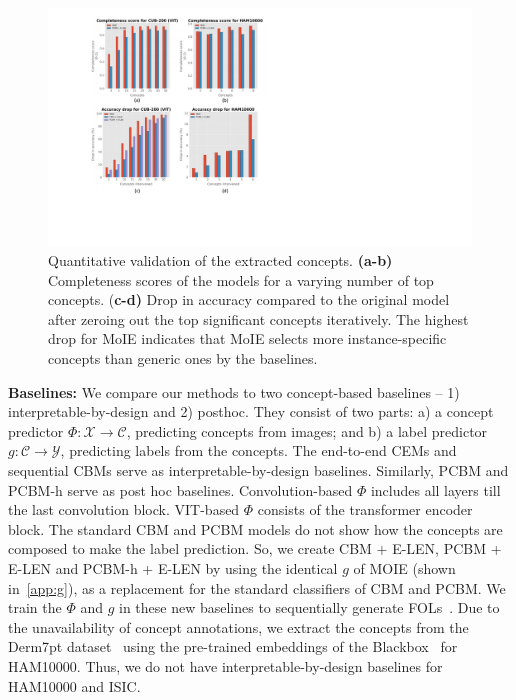 \begin{figure}[h]
\begin{center}
\centerline{\includegraphics[width=\columnwidth]{figures/main/CUB_HAM.pdf}}
\caption{Quantitative validation of the extracted concepts. \textbf{(a-b)} 
Completeness scores of the models for a varying number of top concepts. (\textbf{c-d)} Drop in accuracy compared to the original model after zeroing out the top significant concepts iteratively. The highest drop for MoIE indicates that MoIE selects more instance-specific concepts than generic ones by the baselines. 
}
\label{fig:valid_concepts}
\end{center}
\vskip -0.2in
\end{figure}


\textbf{Baselines:}
We compare our methods to two concept-based baselines -- 1) interpretable-by-design and 2) posthoc. They consist of two parts: a) a concept predictor $\Phi: \mathcal{X} \rightarrow \mathcal{C}$, predicting concepts from images; and b) a label predictor $g: \mathcal{C} \rightarrow \mathcal{Y}$, predicting labels from the concepts. The end-to-end CEMs and sequential CBMs serve as interpretable-by-design baselines. Similarly, PCBM and PCBM-h serve as post hoc baselines. Convolution-based $\Phi$ includes all layers till the last convolution block. VIT-based $\Phi$ consists of the transformer encoder block. The standard CBM and PCBM models do not show how the concepts are composed to make the label prediction. So, we create CBM + E-LEN, PCBM + E-LEN and PCBM-h + E-LEN by using the identical $g$ of MOIE (shown in~\cref{app:g}), as a replacement for the standard classifiers of CBM and 
PCBM. We train the $\Phi$ and $g$ in these new baselines to sequentially generate FOLs~\cite{barbiero2022entropy}. Due to the unavailability of concept annotations, we extract the concepts from the Derm7pt dataset~\cite{kawahara2018seven} using the pre-trained embeddings of the Blackbox~\cite{yuksekgonul2022post} for HAM10000. Thus, we do not have interpretable-by-design baselines for HAM10000 and ISIC.

